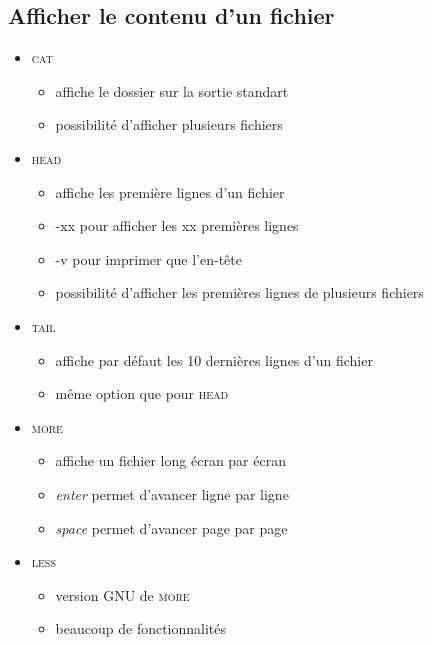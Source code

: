 \documentclass[a4paper]{article}
\begin{document}
    \subsection{Afficher le contenu d'un fichier}
    \begin{itemize}[label=\textbullet, font=\Large]
      \item \textsc{cat}
      \begin{itemize}[label=, font=\scriptsize]
        \item affiche le dossier sur la sortie standart
        \item possibilité d'afficher plusieurs fichiers
      \end{itemize}
      \item \textsc{head}
      \begin{itemize}[label=, font=\scriptsize]
        \item affiche les première lignes d'un fichier
        \item -xx pour afficher les xx premières lignes
        \item -v pour imprimer que l'en-tête
        \item possibilité d'afficher les premières lignes de plusieurs fichiers 
      \end{itemize}
      \item \textsc{tail}
      \begin{itemize}[label=, font=\scriptsize]
        \item affiche par défaut les 10 dernières lignes d'un fichier
        \item même option que pour \textsc{head}
      \end{itemize}
      \item \textsc{more}
      \begin{itemize}[label=, font=\scriptsize]
        \item affiche un fichier long écran par écran
        \item \emph{enter} permet d'avancer ligne par ligne
        \item \emph{space} permet d'avancer page par page 
      \end{itemize}
      \item \textsc{less}
      \begin{itemize}[label=, font=\scriptsize]
        \item version GNU de \textsc{more}
        \item beaucoup de fonctionnalités

\end{itemize}
\end{itemize}
\end{document}
